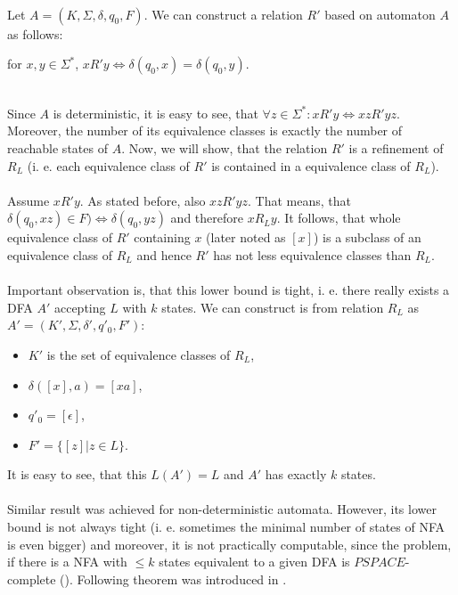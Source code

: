\paragraph{}
\dokaz Let $A = (K, \Sigma , \delta , q_{0}, F)$. We can construct a relation $R'$ based on automaton $A$ as follows: \\
\centerline{for $x, y \in \Sigma ^{*}$, $x R' y \Leftrightarrow \delta (q_{0}, x) = \delta (q_{0}, y)$.} \\
Since $A$ is deterministic, it is easy to see, that $\forall z \in \Sigma ^{*}: xR'y \Leftrightarrow xzR'yz$. Moreover, the number of its equivalence classes is exactly the number of reachable states of $A$. Now, we will show, that the relation $R'$ is a refinement of $R_{L}$ (i. e. each equivalence class of $R'$ is contained in a equivalence class of $R_{L}$).

\paragraph{}
Assume $xR'y$. As stated before, also $xzR'yz$. That means, that $\delta (q_{0}, xz) \in F) \Leftrightarrow \delta (q_{0}, yz)$ and therefore $xR_{L}y$. It follows, that whole equivalence class of $R'$ containing $x$ (later noted as $[x]$) is a subclass of an equivalence class of $R_{L}$ and hence $R'$ has not less equivalence classes than $R_{L}$. \square

\paragraph{}
Important observation is, that this lower bound is tight, i. e. there really exists a DFA $A'$ accepting $L$ with $k$ states. We can construct is from relation $R_{L}$ as $A'=(K', \Sigma , \delta ', q'_{0}, F')$:
\begin{itemize}
\item $K'$ is the set of equivalence classes of $R_{L}$, 
\item $\delta ([x], a) = [xa]$,
\item $q'_{0} = [\epsilon ]$,
\item $F' = \{ [z] | z \in L \}$.
\end{itemize}
It is easy to see, that this $L(A') = L$ and $A'$ has exactly $k$ states.

\paragraph{}
Similar result was achieved for non-deterministic automata. However, its lower bound is not always tight (i. e. sometimes the minimal number of states of NFA is even bigger) and moreover, it is not practically computable, since the problem, if there is a NFA with $\leq k$ states equivalent to a given DFA is $PSPACE$-complete (\cite{rav:minNFA}). Following theorem was introduced in \cite{gla:low}.

